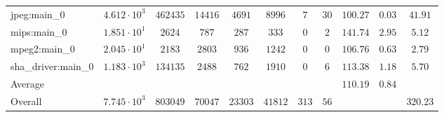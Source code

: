 \begin{tabular}{|l|c|c|c|c|c|c|c|c|c|c|}
jpeg:main\_0            & $ 4.612 \cdot 10^{3}  $ & $ 462435 $ & $ 14416 $ & $ 4691  $ & $ 8996  $ & $ 7   $ & $ 30 $ & $ 100.27      $ & $ 0.03    $ & $ 41.91   $ \\
mips:main\_0            & $ 1.851 \cdot 10^{1}  $ & $ 2624   $ & $ 787   $ & $ 287   $ & $ 333   $ & $ 0   $ & $ 2  $ & $ 141.74      $ & $ 2.95    $ & $ 5.12    $ \\
mpeg2:main\_0           & $ 2.045 \cdot 10^{1}  $ & $ 2183   $ & $ 2803  $ & $ 936   $ & $ 1242  $ & $ 0   $ & $ 0  $ & $ 106.76      $ & $ 0.63    $ & $ 2.79    $ \\
sha\_driver:main\_0     & $ 1.183 \cdot 10^{3}  $ & $ 134135 $ & $ 2488  $ & $ 762   $ & $ 1910  $ & $ 0   $ & $ 6  $ & $ 113.38      $ & $ 1.18    $ & $ 5.70    $ \\
\hline
Average                 & $                     $ & $        $ & $       $ & $       $ & $       $ & $     $ & $    $ & $ 110.19      $ & $ 0.84    $ & $         $ \\
\hline
Overall                 & $ 7.745 \cdot 10^{3}  $ & $ 803049 $ & $ 70047 $ & $ 23303 $ & $ 41812 $ & $ 313 $ & $ 56 $ & $             $ & $         $ & $ 320.23  $ \\
\hline
\end{tabular}
